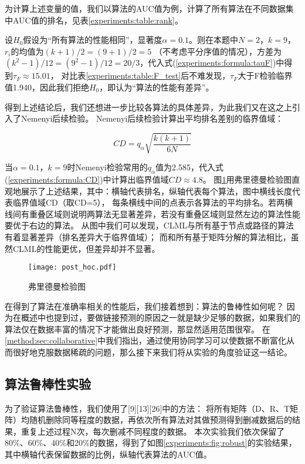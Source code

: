 为计算上述变量的值，我们以算法的AUC值为例，计算了所有算法在不同数据集中AUC值的排名，见表\ref{experiments:table:rank}。




设$H_0$假设为“所有算法的性能相同”，显著度$\alpha=0.1$。则在本题中$N=2$，$k=9$，$r_i$的均值为$(k+1)/2=(9+1)/2=5$
（不考虑平分序值的情况），方差为$(k^2-1)/12=(9^2-1)/12=20/3$，代入式(\ref{experiments:formula:tauF})中得到$\tau_F\approx{15.01}$，
对比表\ref{experiments:table:F_test}后不难发现，$\tau_F$大于F检验临界值1.940，因此我们拒绝$H_0$，即认为“算法的性能有差异”。


得到上述结论后，我们还想进一步比较各算法的具体差异，为此我们又在这之上引入了Nemenyi后续检验。
Nemenyi后续检验计算出平均排名差别的临界值域：

\begin{equation}
    CD=q_{\alpha}\sqrt{\frac{k(k+1)}{6N}}
    \label{experiments:formula:CD}
\end{equation}


当$\alpha=0.1$，$k=9$时Nemenyi检验常用的$q_{\alpha}$值为2.585，代入式(\ref{experiments:formula:CD})中计算出临界值域$CD\approx4.8$。
图\ref{experiments:fig:post_hoc}用弗里德曼检验图直观地展示了上述结果，其中：横轴代表排名，纵轴代表每个算法，图中横线长度代表临界值域CD（取CD=5），
每条横线中间的点表示各算法的平均排名。若两横线间有重叠区域则说明两算法无显著差异，若没有重叠区域则显然左边的算法性能要优于右边的算法。
从图中我们可以发现，CLML与所有基于节点或路径的算法有着显著差异（排名差异大于临界值域）；
而和所有基于矩阵分解的算法相比，虽然CLML的性能更优，但差异却并不显著。

\begin{figure}[]
    \centering
    \texttt{[image: post\_hoc.pdf]}
    \caption{弗里德曼检验图}
    \label{experiments:fig:post_hoc}
\end{figure}


在得到了算法在准确率相关的性能后，我们接着想到：算法的鲁棒性如何呢？
因为在概述中也提到过，要做链接预测的原因之一就是缺少足够的数据，如果我们的算法仅在数据丰富的情况下才能做出良好预测，那显然适用范围很窄。
在\ref{method:sec:collaborative}中我们指出，通过使用协同学习可以使数据不断富化从而很好地克服数据稀疏的问题，那么接下来我们将从实验的角度验证这一结论。


\subsection{算法鲁棒性实验}
为了验证算法鲁棒性，我们使用了[9][13][26]中的方法：
将所有矩阵（D、R、T矩阵）均随机删除同等程度的数据，再依次所有算法对其做预测得到删减数据后的结果，重复上述过程N次，每次删减不同程度的数据。
本次实验我们依次保留了80\%、60\%、40\%和20\%的数据，得到了如图\ref{experiments:fig:robust}的实验结果，其中横轴代表保留数据的比例，纵轴代表算法的AUC值。


